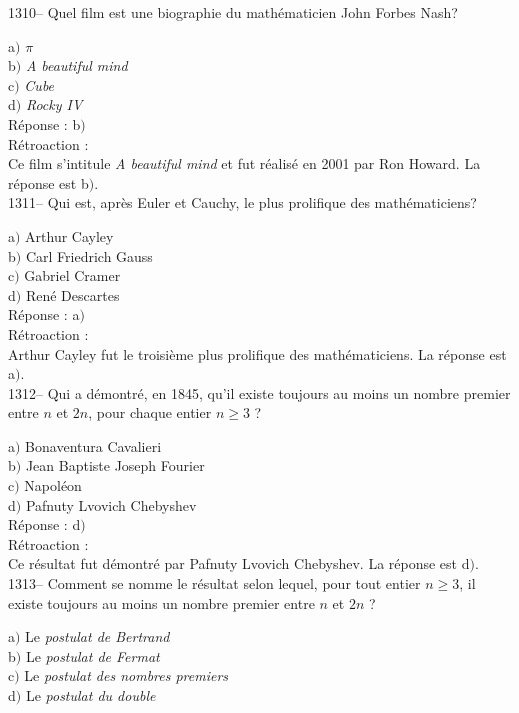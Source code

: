 ﻿\documentclass[letterpaper, 12pt]{article}
\begin{document}
1310-- Quel film est une biographie du math\'ematicien John Forbes
Nash?

a$)$ {\sl $\pi$} \\
b$)$ {\sl A beautiful mind} \\
c$)$ {\sl Cube}  \\
d$)$ {\sl Rocky IV}\\

R\'eponse : b$)$\\

R\'etroaction : \\
Ce film s'intitule {\sl A beautiful mind} et fut r\'ealis\'e en 2001
par Ron Howard.
La r\'eponse est  b$)$.\\

1311-- Qui est, apr\`es Euler et Cauchy, le plus prolifique des
math\'ematiciens?

a$)$ Arthur Cayley \\
b$)$ Carl Friedrich Gauss \\
c$)$ Gabriel Cramer  \\
d$)$ Ren\'e Descartes\\

R\'eponse : a$)$\\

R\'etroaction : \\
Arthur Cayley fut le troisi\`eme plus prolifique des
math\'ematiciens.
La r\'eponse est  a$)$.\\

1312-- Qui a d\'emontr\'e, en 1845, qu'il existe toujours au moins un nombre
premier entre $n$ et $2n$, pour
chaque entier $n\ge3$ ?

a$)$ Bonaventura Cavalieri \\
b$)$ Jean Baptiste Joseph Fourier \\
c$)$ Napol\'eon  \\
d$)$ Pafnuty Lvovich Chebyshev\\

R\'eponse : d$)$\\

R\'etroaction : \\
Ce r\'esultat fut d\'emontr\'e par Pafnuty Lvovich Chebyshev.
La r\'eponse est  d$)$.\\

1313-- Comment se nomme le r\'esultat selon lequel, pour tout entier
$n\ge3$, il existe toujours au moins un nombre premier entre $n$ et $2n$ ?

a$)$ Le {\sl postulat de Bertrand} \\
b$)$ Le {\sl postulat de Fermat} \\
c$)$ Le {\sl postulat des nombres premiers}  \\
d$)$ Le {\sl postulat du double}\\
\end{document}
